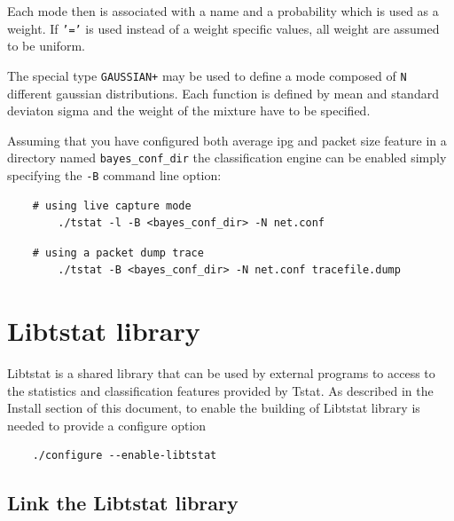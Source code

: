 \documentclass[11pt]{article}
\begin{document}
Each mode then is associated with a name and a probability which is used as a weight.
If \texttt{'='} is used instead of a weight specific values, all weight are assumed to be uniform.



The special type \texttt{GAUSSIAN+} may be used to define a mode composed of \texttt{N} 
different gaussian distributions. Each function is defined by mean and standard deviaton sigma
and the weight of the mixture have to be specified.



Assuming that you have configured both average ipg and packet size feature 
in a directory named \texttt{bayes\_conf\_dir} the classification engine can be 
enabled simply specifying the \texttt{-B} command line option:

\begin{small}\begin{verbatim}
    # using live capture mode
        ./tstat -l -B <bayes_conf_dir> -N net.conf
\end{verbatim}\end{small} \noindent
\begin{small}\begin{verbatim}
    # using a packet dump trace
        ./tstat -B <bayes_conf_dir> -N net.conf tracefile.dump
\end{verbatim}\end{small} \noindent
\section{Libtstat library\label{Libtstat_library}}


Libtstat is a shared library that can be used by external programs to access to
the statistics and classification features provided by Tstat. 
As described in the Install section of this document, to enable the building of
Libtstat library is needed to provide a configure option

\begin{small}\begin{verbatim}
    ./configure --enable-libtstat
\end{verbatim}\end{small} \noindent
\subsection{Link the Libtstat library\label{Link_the_Libtstat_library}}
\end{document}
